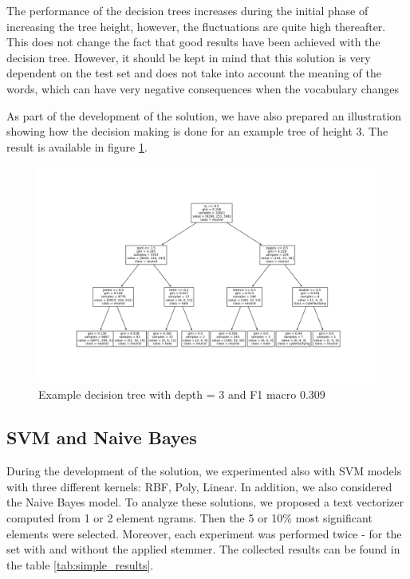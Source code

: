 \documentclass[a4paper]{article}
\begin{document}
The performance of the decision trees increases during the initial phase of increasing the tree height, however, the fluctuations are quite high thereafter. This does not change the fact that good results have been achieved with the decision tree. However, it should be kept in mind that this solution is very dependent on the test set and does not take into account the meaning of the words, which can have very negative consequences when the vocabulary changes 


As part of the development of the solution, we have also prepared an illustration showing how the decision making is done for an example tree of height 3. The result is available in figure \ref{fig:example_tree}.

\begin{figure}[h]
\centering
\includegraphics[width=\textwidth]{plots/decision_tree_plot.png}
\caption{Example decision tree with depth = 3 and F1 macro 0.309}
\label{fig:example_tree}
\end{figure}


\subsection{SVM and Naive Bayes}

During the development of the solution, we experimented also with SVM models with three different kernels: RBF, Poly, Linear. In addition, we also considered the Naive Bayes model. To analyze these solutions, we proposed a text vectorizer computed from 1 or 2 element ngrams. Then the 5 or 10\% most significant elements were selected. Moreover, each experiment was performed twice - for the set with and without the applied stemmer. The collected results can be found in the table \ref{tab:simple_results}.
\end{document}
